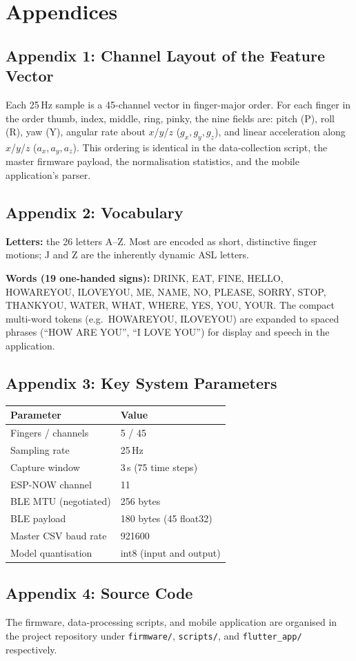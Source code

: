 \chapter*{Appendices}

\section*{Appendix 1: Channel Layout of the Feature Vector}

Each 25\,Hz sample is a 45-channel vector in finger-major order. For each finger
in the order thumb, index, middle, ring, pinky, the nine fields are: pitch (P),
roll (R), yaw (Y), angular rate about $x$/$y$/$z$ ($g_x,g_y,g_z$), and linear
acceleration along $x$/$y$/$z$ ($a_x,a_y,a_z$). This ordering is identical in
the data-collection script, the master firmware payload, the normalisation
statistics, and the mobile application's parser.

\section*{Appendix 2: Vocabulary}

\textbf{Letters:} the 26 letters A--Z. Most are encoded as short, distinctive
finger motions; J and Z are the inherently dynamic ASL letters.

\textbf{Words (19 one-handed signs):} DRINK, EAT, FINE, HELLO, HOWAREYOU,
ILOVEYOU, ME, NAME, NO, PLEASE, SORRY, STOP, THANKYOU, WATER, WHAT, WHERE, YES,
YOU, YOUR. The compact multi-word tokens (e.g.\ HOWAREYOU, ILOVEYOU) are
expanded to spaced phrases (``HOW ARE YOU'', ``I LOVE YOU'') for display and
speech in the application.

\section*{Appendix 3: Key System Parameters}

\begin{tabular}{ll}
\toprule
Parameter & Value \\
\midrule
Fingers / channels        & 5 / 45 \\
Sampling rate             & 25\,Hz \\
Capture window            & 3\,s (75 time steps) \\
ESP-NOW channel           & 11 \\
BLE MTU (negotiated)      & 256 bytes \\
BLE payload               & 180 bytes (45 float32) \\
Master CSV baud rate      & 921600 \\
Model quantisation        & int8 (input and output) \\
\bottomrule
\end{tabular}

\section*{Appendix 4: Source Code}

The firmware, data-processing scripts, and mobile application are organised in
the project repository under \texttt{firmware/}, \texttt{scripts/}, and
\texttt{flutter\_app/} respectively.

